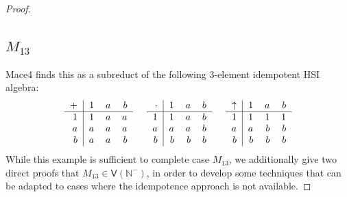 \documentclass[eqnor,reqno]{amsart}
\theoremstyle{plain}
\theoremstyle{definition}
\begin{document}
\begin{proof}
\subsection{$M_{13}$}  Mace4 finds this as a subreduct of the following $3$-element idempotent HSI algebra:
\[
\begin{tabular}{r|rrr}
$+$ & $1$ & $a$ & $b$\\
\hline
    $1$ & $1$ & $a$ & $a$ \\
    $a$ & $a$ & $a$ & $a$ \\
    $b$ & $a$ & $a$ & $b$
\end{tabular} \hspace{.5cm}
\begin{tabular}{r|rrr}
$\cdot$ & $1$ & $a$ & $b$\\
\hline
    $1$ & $1$ & $a$ & $b$ \\
    $a$ & $a$ & $a$ & $b$ \\
    $b$ & $b$ & $b$ & $b$
\end{tabular} \hspace{.5cm}
\begin{tabular}{r|rrr}
$\uparrow$ & $1$ & $a$ & $b$\\
\hline
    $1$ & $1$ & $1$ & $1$ \\
    $a$ & $a$ & $b$ & $b$ \\
    $b$ & $b$ & $b$ & $b$
\end{tabular}
\]
While this example is sufficient to complete case $M_{13}$, we additionally give two direct proofs that $M_{13}\in\mathsf{V}(\mathbb{N}^-)$, in order to  develop some techniques that can be adapted to cases where the idempotence approach is not available.  

\end{proof}
\end{document}
